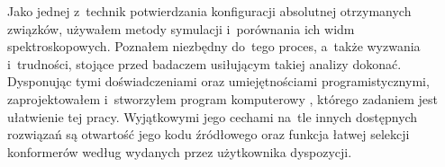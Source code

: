 Jako jednej z~technik potwierdzania konfiguracji absolutnej otrzymanych związków, używałem
  metody symulacji i~porównania ich widm spektroskopowych.
Poznałem niezbędny do~tego proces, a~także wyzwania i~trudności, stojące przed badaczem
  usiłującym takiej analizy dokonać.
Dysponując tymi doświadczeniami oraz umiejętnościami programistycznymi, zaprojektowałem
  i~stworzyłem program komputerowy \tesliper{}, którego zadaniem jest ułatwienie tej pracy.
Wyjątkowymi jego cechami na~tle innych dostępnych rozwiązań są otwartość jego kodu źródłowego
  oraz funkcja łatwej selekcji konformerów według wydanych przez użytkownika dyspozycji.
